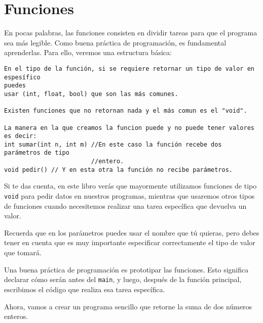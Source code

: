 \documentclass[
  11pt,
  a4paper,
  DIV=11,
  numbers=noendperiod]{scrreprt}
\begin{document}

\chapter{Funciones}\label{funciones}

En pocas palabras, las funciones consisten en dividir tareas para que el
programa sea más legible. Como buena práctica de programación, es
fundamental aprenderlas. Para ello, veremos una estructura básica:

\begin{tcolorbox}[custombox]
\begin{verbatim}
En el tipo de la función, si se requiere retornar un tipo de valor en espesífico 
puedes
usar (int, float, bool) que son las más comunes.

Existen funciones que no retornan nada y el más comun es el "void".

La manera en la que creamos la funcion puede y no puede tener valores es decir:
int sumar(int n, int m) //En este caso la función recebe dos parámetros de tipo 
                        //entero.
void pedir() // Y en esta otra la función no recibe parámetros.
\end{verbatim}
\end{tcolorbox}

Si te das cuenta, en este libro verás que mayormente utilizamos
funciones de tipo \texttt{void} para pedir datos en nuestros programas,
mientras que usaremos otros tipos de funciones cuando necesitemos
realizar una tarea específica que devuelva un valor.

Recuerda que en los parámetros puedes usar el nombre que tú quieras,
pero debes tener en cuenta que es muy importante especificar
correctamente el tipo de valor que tomará.

Una buena práctica de programación es prototipar las funciones. Esto
significa declarar cómo serán antes del \texttt{main}, y luego, después
de la función principal, escribimos el código que realiza esa tarea
específica.

Ahora, vamos a crear un programa sencillo que retorne la suma de dos
números enteros.
\end{document}
